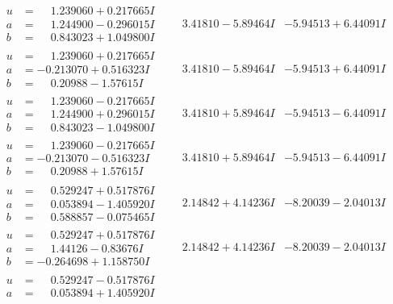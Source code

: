 \documentclass[1p]{elsarticle_modified}
\theoremstyle{definition}
\begin{document}
$$\begin{array}{c|c|c}
\begin{aligned}
u &= \phantom{-}1.239060 + 0.217665 I \\
a &= \phantom{-}1.244900 - 0.296015 I \\
b &= \phantom{-}0.843023 + 1.049800 I\end{aligned}
 & \phantom{-}3.41810 - 5.89464 I & -5.94513 + 6.44091 I \\ \hline\begin{aligned}
u &= \phantom{-}1.239060 + 0.217665 I \\
a &= -0.213070 + 0.516323 I \\
b &= \phantom{-}0.20988 - 1.57615 I\end{aligned}
 & \phantom{-}3.41810 - 5.89464 I & -5.94513 + 6.44091 I \\ \hline\begin{aligned}
u &= \phantom{-}1.239060 - 0.217665 I \\
a &= \phantom{-}1.244900 + 0.296015 I \\
b &= \phantom{-}0.843023 - 1.049800 I\end{aligned}
 & \phantom{-}3.41810 + 5.89464 I & -5.94513 - 6.44091 I \\ \hline\begin{aligned}
u &= \phantom{-}1.239060 - 0.217665 I \\
a &= -0.213070 - 0.516323 I \\
b &= \phantom{-}0.20988 + 1.57615 I\end{aligned}
 & \phantom{-}3.41810 + 5.89464 I & -5.94513 - 6.44091 I \\ \hline\begin{aligned}
u &= \phantom{-}0.529247 + 0.517876 I \\
a &= \phantom{-}0.053894 - 1.405920 I \\
b &= \phantom{-}0.588857 - 0.075465 I\end{aligned}
 & \phantom{-}2.14842 + 4.14236 I & -8.20039 - 2.04013 I \\ \hline\begin{aligned}
u &= \phantom{-}0.529247 + 0.517876 I \\
a &= \phantom{-}1.44126 - 0.83676 I \\
b &= -0.264698 + 1.158750 I\end{aligned}
 & \phantom{-}2.14842 + 4.14236 I & -8.20039 - 2.04013 I \\ \hline\begin{aligned}
u &= \phantom{-}0.529247 - 0.517876 I \\
a &= \phantom{-}0.053894 + 1.405920 I \\

\end{aligned}
\end{array}$$
\end{document}
